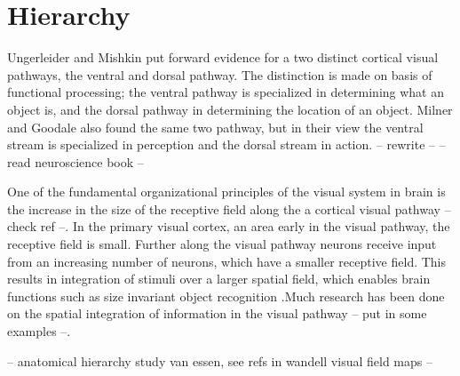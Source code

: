 \section{Hierarchy}


Ungerleider and Mishkin \cite{mishkin1983object} put forward evidence for a two distinct cortical visual pathways, the ventral and dorsal pathway. The distinction is made on basis of functional processing; the ventral pathway is specialized in determining what an object is, and the dorsal pathway in determining the location of an object. Milner and Goodale \cite{milner2008two, goodale1992separate} also found the same two pathway, but in their view the ventral stream is specialized in perception and the dorsal stream in action. -- rewrite -- --read neuroscience book --

One of the fundamental organizational principles of the visual system in brain is the increase in the size of the receptive field along the a cortical visual pathway \cite{hubel1988eye,hubel1962receptive,lerner2001hierarchical} -- check ref --. In the primary visual cortex, an area early in the visual pathway, the receptive field is small. Further along the visual pathway neurons receive input from an increasing number of neurons, which have a smaller receptive field. This results in integration of stimuli over a larger spatial field, which enables brain functions such as size invariant object recognition \cite{kobatake1994neuronal}.Much research has been done on the spatial integration of information in the visual pathway \cite{deyoe1996mapping} -- put in some examples --. 


-- anatomical hierarchy study van essen, see refs in wandell visual field maps --


